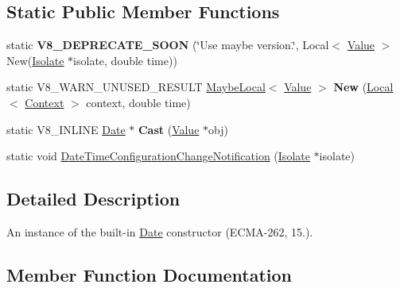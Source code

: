 \subsection*{Static Public Member Functions}
\begin{DoxyCompactItemize}
\item 
\mbox{\label{classv8_1_1Date_a4537a2f3b7de01ccc40784923ccece11}} 
static {\bfseries V8\+\_\+\+D\+E\+P\+R\+E\+C\+A\+T\+E\+\_\+\+S\+O\+ON} (\char`\"{}Use maybe version.\char`\"{}, Local$<$ \mbox{\hyperlink{classv8_1_1Value}{Value}} $>$ New(\mbox{\hyperlink{classv8_1_1Isolate}{Isolate}} $\ast$isolate, double time))
\item 
\mbox{\label{classv8_1_1Date_a07639d26ad5bc9564c2411a1c14f7d70}} 
static V8\+\_\+\+W\+A\+R\+N\+\_\+\+U\+N\+U\+S\+E\+D\+\_\+\+R\+E\+S\+U\+LT \mbox{\hyperlink{classv8_1_1MaybeLocal}{Maybe\+Local}}$<$ \mbox{\hyperlink{classv8_1_1Value}{Value}} $>$ {\bfseries New} (\mbox{\hyperlink{classv8_1_1Local}{Local}}$<$ \mbox{\hyperlink{classv8_1_1Context}{Context}} $>$ context, double time)
\item 
\mbox{\label{classv8_1_1Date_aebb004782ef43f01518f24e662ef6ad8}} 
static V8\+\_\+\+I\+N\+L\+I\+NE \mbox{\hyperlink{classv8_1_1Date}{Date}} $\ast$ {\bfseries Cast} (\mbox{\hyperlink{classv8_1_1Value}{Value}} $\ast$obj)
\item 
static void \mbox{\hyperlink{classv8_1_1Date_adb084ec0683d3d195ad0f78af5f6f72b}{Date\+Time\+Configuration\+Change\+Notification}} (\mbox{\hyperlink{classv8_1_1Isolate}{Isolate}} $\ast$isolate)
\end{DoxyCompactItemize}


\subsection{Detailed Description}
An instance of the built-\/in \mbox{\hyperlink{classv8_1_1Date}{Date}} constructor (E\+C\+M\+A-\/262, 15.). 

\subsection{Member Function Documentation}
\mbox{\label{classv8_1_1Date_adb084ec0683d3d195ad0f78af5f6f72b}} 
